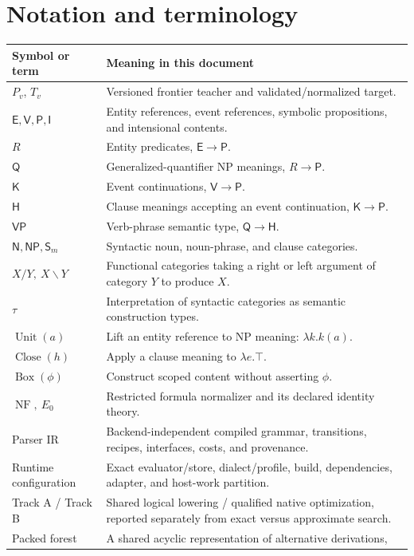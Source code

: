 \documentclass[11pt,a4paper]{article}
\newcommand{\E}{\mathsf{E}}
\newcommand{\V}{\mathsf{V}}
\newcommand{\Prop}{\mathsf{P}}
\newcommand{\Int}{\mathsf{I}}
\newcommand{\Q}{\mathsf{Q}}
\newcommand{\HH}{\mathsf{H}}
\newcommand{\KK}{\mathsf{K}}
\newcommand{\VP}{\mathsf{VP}}
\newcommand{\NP}{\mathsf{NP}}
\newcommand{\NC}{\mathsf{N}}
\newcommand{\Close}{\operatorname{Close}}
\newcommand{\Unit}{\operatorname{Unit}}
\newcommand{\Bx}{\operatorname{Box}}
\newcommand{\NF}{\operatorname{NF}}
\begin{document}
\clearpage
\section{Notation and terminology}\label{app:notation}

\begin{longtable}{L{34mm}L{114mm}}
\toprule
Symbol or term & Meaning in this document \\
\midrule
\endhead
\(P_v\), \(T_v\) & Versioned frontier teacher and validated/normalized target. \\
\(\E,\V,\Prop,\Int\) & Entity references, event references, symbolic
propositions, and intensional contents. \\
\(R\) & Entity predicates, \(\E\to\Prop\). \\
\(\Q\) & Generalized-quantifier NP meanings, \(R\to\Prop\). \\
\(\KK\) & Event continuations, \(\V\to\Prop\). \\
\(\HH\) & Clause meanings accepting an event continuation, \(\KK\to\Prop\). \\
\(\VP\) & Verb-phrase semantic type, \(\Q\to\HH\). \\
\(\NC,\NP,\mathsf S_m\) & Syntactic noun, noun-phrase, and clause categories. \\
\(X/Y,\ X\backslash Y\) & Functional categories taking a right or left argument
of category \(Y\) to produce \(X\). \\
\(\tau\) & Interpretation of syntactic categories as semantic construction
types. \\
\(\Unit(a)\) & Lift an entity reference to NP meaning:
\(\lambda k.k(a)\). \\
\(\Close(h)\) & Apply a clause meaning to \(\lambda e.\top\). \\
\(\Bx(\phi)\) & Construct scoped content without asserting \(\phi\). \\
\(\NF,\ E_0\) & Restricted formula normalizer and its declared identity theory. \\
Parser IR & Backend-independent compiled grammar, transitions, recipes,
interfaces, costs, and provenance. \\
Runtime configuration & Exact evaluator/store, dialect/profile, build,
dependencies, adapter, and host-work partition. \\
Track A / Track B & Shared logical lowering / qualified native optimization,
reported separately from exact versus approximate search. \\
Packed forest & A shared acyclic representation of alternative derivations,

\end{longtable}
\end{document}
